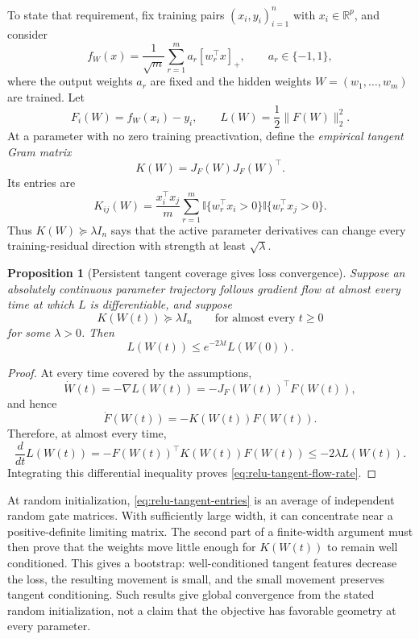 \documentclass[11pt,twoside]{article}
\newcommand{\I}{\mathbb I}
\newcommand{\R}{\mathbb R}
\newtheorem{proposition}[theorem]{Proposition}
\theoremstyle{definition}
\theoremstyle{remark}
\begin{document}
To state that requirement, fix training pairs
$(x_i,y_i)_{i=1}^n$ with $x_i\in\R^p$, and consider
\[
 f_W(x)=\frac1{\sqrt m}\sum_{r=1}^m a_r[w_r^\top x]_+,
 \qquad a_r\in\{-1,1\},
\]
where the output weights $a_r$ are fixed and the hidden weights
$W=(w_1,\ldots,w_m)$ are trained. Let
\[
 F_i(W)=f_W(x_i)-y_i,
 \qquad
 L(W)=\frac12\|F(W)\|_2^2.
\]
At a parameter with no zero training preactivation, define the
\emph{empirical tangent Gram matrix}
\begin{equation}
 K(W)=J_F(W)J_F(W)^\top.
 \label{eq:relu-tangent-gram}
\end{equation}
Its entries are
\begin{equation}
 K_{ij}(W)
 =\frac{x_i^\top x_j}{m}\sum_{r=1}^m
   \I\{w_r^\top x_i>0\}\I\{w_r^\top x_j>0\}.
 \label{eq:relu-tangent-entries}
\end{equation}
Thus $K(W)\succeq\lambda I_n$ says that the active parameter derivatives
can change every training-residual direction with strength at least
$\sqrt\lambda$.

\begin{proposition}[Persistent tangent coverage gives loss convergence]
\label{prop:relu-tangent-flow}
Suppose an absolutely continuous parameter trajectory follows gradient flow
at almost every time at which $L$ is differentiable, and suppose
\[
 K(W(t))\succeq\lambda I_n
 \qquad\text{for almost every }t\ge0
\]
for some $\lambda>0$. Then
\begin{equation}
 L(W(t))\le e^{-2\lambda t}L(W(0)).
 \label{eq:relu-tangent-flow-rate}
\end{equation}
\end{proposition}

\begin{proof}
At every time covered by the assumptions,
\[
 \dot W(t)=-\nabla L(W(t))=-J_F(W(t))^\top F(W(t)),
\]
and hence
\[
 \dot F(W(t))=-K(W(t))F(W(t)).
\]
Therefore, at almost every time,
\[
 \frac{d}{dt}L(W(t))
 =-F(W(t))^\top K(W(t))F(W(t))
 \le-2\lambda L(W(t)).
\]
Integrating this differential inequality proves
\cref{eq:relu-tangent-flow-rate}.
\end{proof}

At random initialization, \cref{eq:relu-tangent-entries} is an average of
independent random gate matrices. With sufficiently large width, it can
concentrate near a positive-definite limiting matrix. The second part of a
finite-width argument must then prove that the weights move little enough for
$K(W(t))$ to remain well conditioned. This gives a bootstrap:
well-conditioned tangent features decrease the loss, the resulting movement
is small, and the small movement preserves tangent conditioning. Such results
give global convergence from the stated random initialization, not a claim
that the objective has favorable geometry at every parameter.
\end{document}
